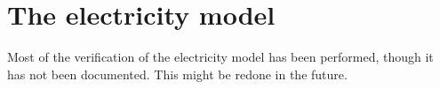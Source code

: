 \section{The electricity model}
\label{sec:verificationElec}

Most of the verification of the electricity model has been performed, though it has not been documented. This might be redone in the future.


%
%
%
%
%
%
%
%
%
%
%
